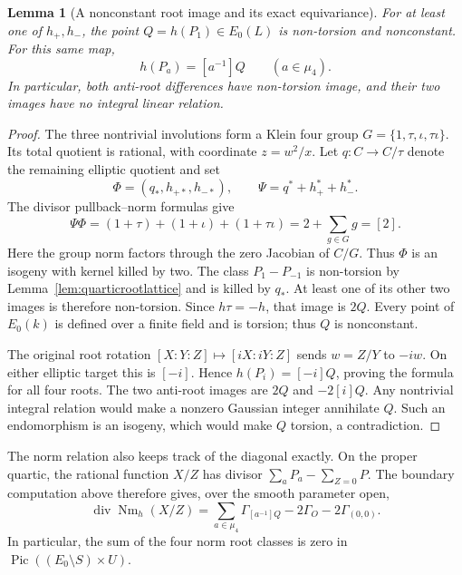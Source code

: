 \documentclass[11pt,a4paper]{article}
\newtheorem{lemma}[theorem]{Lemma}
\theoremstyle{remark}
\begin{document}
\begin{lemma}[A nonconstant root image and its exact equivariance]
\label{lem:quarticnonconstantroot}
For at least one of $h_+,h_-$, the point $Q=h(P_1)\in E_0(L)$
is non-torsion and nonconstant. For this same map,
\[
 h(P_a)=[a^{-1}]Q\qquad(a\in\mu_4).
\]
In particular, both anti-root differences have non-torsion image,
and their two images have no integral linear relation.
\end{lemma}
\begin{proof}
The three nontrivial involutions form a Klein four group
$G=\{1,\tau,\iota,\tau\iota\}$. Its total quotient is rational,
with coordinate $z=w^2/x$. Let $q:C\to C/\tau$ denote the remaining
elliptic quotient and set
\[
 \Phi=(q_*,h_{+*},h_{-*}),\qquad
 \Psi=q^*+h_+^*+h_-^*.
\]
The divisor pullback--norm formulas give
\[
 \Psi\Phi=(1+\tau)+(1+\iota)+(1+\tau\iota)
          =2+\sum_{g\in G}g=[2].
\]
Here the group norm factors through the zero Jacobian of $C/G$.
Thus $\Phi$ is an isogeny with kernel killed by two. The class
$P_1-P_{-1}$ is non-torsion by Lemma~\ref{lem:quarticrootlattice}
and is killed by $q_*$. At least one of its other two images is
therefore non-torsion. Since $h\tau=-h$, that image is $2Q$.
Every point of $E_0(k)$ is defined over a finite field and is torsion;
thus $Q$ is nonconstant.

The original root rotation $[X:Y:Z]\mapsto[iX:iY:Z]$ sends
$w=Z/Y$ to $-iw$. On either elliptic target this is $[-i]$.
Hence $h(P_i)=[-i]Q$, proving the formula for all four roots.
The two anti-root images are $2Q$ and $-2[i]Q$.
Any nontrivial integral relation would make a nonzero Gaussian
integer annihilate $Q$. Such an endomorphism is an isogeny, which
would make $Q$ torsion, a contradiction.
\end{proof}

The norm relation also keeps track of the diagonal exactly. On the
proper quartic, the rational function $X/Z$ has divisor
$\sum_a P_a-\sum_{Z=0}P$. The boundary computation above therefore
gives, over the smooth parameter open,
\begin{equation}\label{eq:quarticnormdiagonal}
 \operatorname{div}\operatorname{Nm}_h(X/Z)
  =\sum_{a\in\mu_4}\Gamma_{[a^{-1}]Q}
       -2\Gamma_O-2\Gamma_{(0,0)}.
\end{equation}
In particular, the sum of the four norm root classes is zero in
$\operatorname{Pic}((E_0\setminus S)\times U)$.
\end{document}
